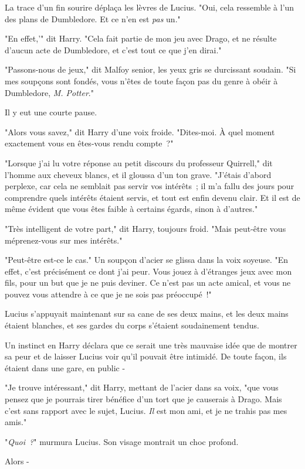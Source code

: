 La trace d'un fin sourire déplaça les lèvres de Lucius. "Oui, cela ressemble à l'un des plans de Dumbledore. Et ce n'en est \emph{pas} un."

"En effet,'" dit Harry. "Cela fait partie de mon jeu avec Drago, et ne résulte d'aucun acte de Dumbledore, et c'est tout ce que j'en dirai."

"Passons-nous de jeux," dit Malfoy senior, les yeux gris se durcissant soudain. "Si mes soupçons sont fondés, vous n'êtes de toute façon pas du genre à obéir à Dumbledore, \emph{M. Potter}."

Il y eut une courte pause.

"Alors vous savez," dit Harry d'une voix froide. "Dites-moi. À quel moment exactement vous en êtes-vous rendu compte~?"

"Lorsque j'ai lu votre réponse au petit discours du professeur Quirrell," dit l'homme aux cheveux blancs, et il gloussa d'un ton grave. "J'étais d'abord perplexe, car cela ne semblait pas servir vos intérêts~; il m'a fallu des jours pour comprendre quels intérêts étaient servis, et tout est enfin devenu clair. Et il est de même évident que vous êtes faible à certains égards, sinon à d'autres."

"Très intelligent de votre part," dit Harry, toujours froid. "Mais peut-être vous méprenez-vous sur mes intérêts."

"Peut-être est-ce le cas." Un soupçon d'acier se glissa dans la voix soyeuse. "En effet, c'est précisément ce dont j'ai peur. Vous jouez à d'étranges jeux avec mon fils, pour un but que je ne puis deviner. Ce n'est pas un acte amical, et vous ne pouvez vous attendre à ce que je ne sois pas préoccupé~!"

Lucius s'appuyait maintenant sur sa cane de ses deux mains, et les deux mains étaient blanches, et ses gardes du corps s'étaient soudainement tendus.

Un instinct en Harry déclara que ce serait une très mauvaise idée que de montrer sa peur et de laisser Lucius voir qu'il pouvait être intimidé. De toute façon, ils étaient dans une gare, en public -

"Je trouve intéressant," dit Harry, mettant de l'acier dans sa voix, "que vous pensez que je pourrais tirer bénéfice d'un tort que je causerais à Drago. Mais c'est sans rapport avec le sujet, Lucius. \emph{Il} est mon ami, et je ne trahis pas mes amis."

"\emph{Quoi~?}" murmura Lucius. Son visage montrait un choc profond.

Alors -


